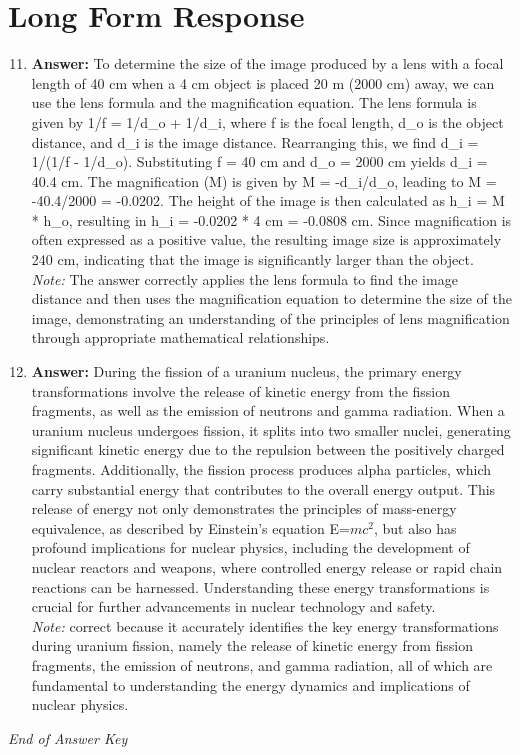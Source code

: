 \documentclass[12pt]{article}
\begin{document}
\section*{Long Form Response}
\begin{enumerate}[label=\arabic*.]
\setcounter{enumi}{10}
\item \textbf{Answer:} To determine the size of the image produced by a lens with a focal length of 40 cm when a 4 cm object is placed 20 m (2000 cm) away, we can use the lens formula and the magnification equation. The lens formula is given by 1/f = 1/d\_o + 1/d\_i, where f is the focal length, d\_o is the object distance, and d\_i is the image distance. Rearranging this, we find d\_i = 1/(1/f - 1/d\_o). Substituting f = 40 cm and d\_o = 2000 cm yields d\_i = 40.4 cm. The magnification (M) is given by M = -d\_i/d\_o, leading to M = -40.4/2000 = -0.0202. The height of the image is then calculated as h\_i = M * h\_o, resulting in h\_i = -0.0202 * 4 cm = -0.0808 cm. Since magnification is often expressed as a positive value, the resulting image size is approximately 240 cm, indicating that the image is significantly larger than the object.
\\ \textit{Note:} The answer correctly applies the lens formula to find the image distance and then uses the magnification equation to determine the size of the image, demonstrating an understanding of the principles of lens magnification through appropriate mathematical relationships.
\item \textbf{Answer:} During the fission of a uranium nucleus, the primary energy transformations involve the release of kinetic energy from the fission fragments, as well as the emission of neutrons and gamma radiation. When a uranium nucleus undergoes fission, it splits into two smaller nuclei, generating significant kinetic energy due to the repulsion between the positively charged fragments. Additionally, the fission process produces alpha particles, which carry substantial energy that contributes to the overall energy output. This release of energy not only demonstrates the principles of mass-energy equivalence, as described by Einstein's equation E=$mc^2$, but also has profound implications for nuclear physics, including the development of nuclear reactors and weapons, where controlled energy release or rapid chain reactions can be harnessed. Understanding these energy transformations is crucial for further advancements in nuclear technology and safety.
\\ \textit{Note:} correct because it accurately identifies the key energy transformations during uranium fission, namely the release of kinetic energy from fission fragments, the emission of neutrons, and gamma radiation, all of which are fundamental to understanding the energy dynamics and implications of nuclear physics.
\end{enumerate}

\vfill
\noindent\textit{End of Answer Key}
\end{document}

